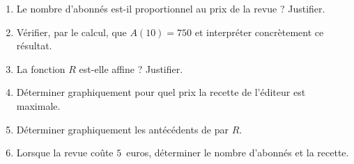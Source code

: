 \begin{enumerate}
\item Le nombre d'abonnés est-il proportionnel au prix de la revue ? Justifier. 
\item Vérifier, par le calcul, que $A(10) = 750$ et interpréter concrètement ce résultat. 
\item La fonction $R$ est-elle affine ? Justifier. 
\item Déterminer graphiquement pour quel prix la recette de l'éditeur est maximale. 
\item Déterminer graphiquement les antécédents de  par $R$. 
\item Lorsque la revue coûte $5$~euros, déterminer le nombre d'abonnés et la recette. 
\end{enumerate}

\bigskip

